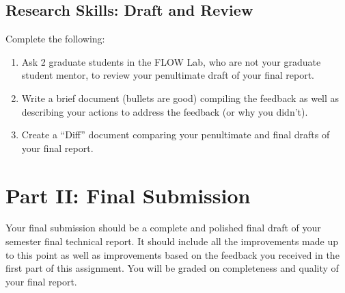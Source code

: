 \documentclass[12pt]{article}
\begin{document}
\subsection{Research Skills: Draft and Review}
	
Complete the following:
\begin{enumerate}[label=\alph*.]
	\item Ask 2 graduate students in the FLOW Lab, who are not your graduate student mentor, to review your penultimate draft of your final report.
	\item Write a brief document (bullets are good) compiling the feedback as well as describing your actions to address the feedback (or why you didn't).
	\item Create a ``Diff'' document comparing your penultimate and final drafts of your final report.
\end{enumerate}



\section{Part II: Final Submission}

Your final submission should be a complete and polished final draft of your semester final technical report.
It should include all the improvements made up to this point as well as improvements based on the feedback you received in the first part of this assignment.
You will be graded on completeness and quality of your final report.
	
	
	
\end{document}
